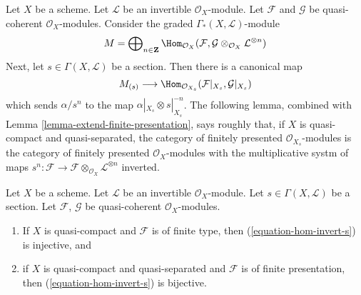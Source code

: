 \noindent
Let $X$ be a scheme. Let $\mathcal{L}$ be an invertible $\mathcal{O}_X$-module.
Let $\mathcal{F}$ and $\mathcal{G}$ be quasi-coherent $\mathcal{O}_X$-modules.
Consider the graded $\Gamma_*(X, \mathcal{L})$-module
$$
M = \bigoplus\nolimits_{n \in \mathbf{Z}} \Hom_{\mathcal{O}_X}(\mathcal{F},
\mathcal{G} \otimes_{\mathcal{O}_X} \mathcal{L}^{\otimes n})
$$
Next, let $s \in \Gamma(X, \mathcal{L})$ be a section. Then there is a
canonical map
\begin{equation}
\label{equation-hom-invert-s}
M_{(s)} \longrightarrow
\Hom_{\mathcal{O}_{X_s}}(\mathcal{F}|_{X_s}, \mathcal{G}|_{X_s})
\end{equation}
which sends $\alpha/s^n$ to the map $\alpha|_{X_s} \otimes s|_{X_s}^{-n}$.
The following lemma, combined with
Lemma \ref{lemma-extend-finite-presentation},
says roughly that, if $X$ is quasi-compact and quasi-separated,
the category of finitely presented $\mathcal{O}_{X_s}$-modules
is the category of finitely presented $\mathcal{O}_X$-modules
with the multiplicative systm of maps
$s^n: \mathcal{F} \to
\mathcal{F} \otimes_{\mathcal{O}_X} \mathcal{L}^{\otimes n}$ inverted.

\begin{lemma}
\label{lemma-section-maps-backwards}
Let $X$ be a scheme. Let $\mathcal{L}$ be an invertible $\mathcal{O}_X$-module.
Let $s \in \Gamma(X, \mathcal{L})$ be a section.
Let $\mathcal{F}$, $\mathcal{G}$ be quasi-coherent $\mathcal{O}_X$-modules.
\begin{enumerate}
\item If $X$ is quasi-compact and $\mathcal{F}$ is of finite type,
then (\ref{equation-hom-invert-s}) is injective, and
\item if $X$ is quasi-compact and quasi-separated and $\mathcal{F}$
is of finite presentation, then
(\ref{equation-hom-invert-s})
is bijective.
\end{enumerate}
\end{lemma}

